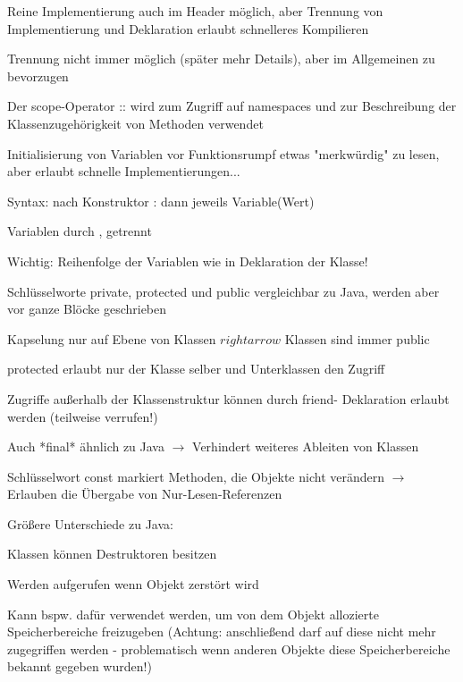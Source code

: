 \documentclass[10pt]{article}
\begin{document}
\begin{itemize*}
\begin{itemize*}
  \item Reine Implementierung auch im Header möglich, aber Trennung von Implementierung und Deklaration erlaubt schnelleres Kompilieren
  \item Trennung nicht immer möglich (später mehr Details), aber im Allgemeinen zu bevorzugen
  \item Der scope-Operator :: wird zum Zugriff auf namespaces und zur Beschreibung der Klassenzugehörigkeit von Methoden verwendet
  \item Initialisierung von Variablen vor Funktionsrumpf etwas "merkwürdig" zu lesen, aber erlaubt schnelle Implementierungen...
  \begin{itemize*}
    \item Syntax: nach Konstruktor : dann jeweils Variable(Wert)
    \item Variablen durch , getrennt
    \item Wichtig: Reihenfolge der Variablen wie in Deklaration der Klasse!
  \end{itemize*}
  \item Schlüsselworte private, protected und public vergleichbar zu Java, werden aber vor ganze Blöcke geschrieben
  \begin{itemize*}
    \item Kapselung nur auf Ebene von Klassen $rightarrow$ Klassen sind immer public
    \item protected erlaubt nur der Klasse selber und Unterklassen den Zugriff
  \end{itemize*}
  \item Zugriffe außerhalb der Klassenstruktur können durch friend- Deklaration erlaubt werden (teilweise verrufen!)
  \item Auch *final* ähnlich zu Java $\rightarrow$ Verhindert weiteres Ableiten von Klassen
  \item Schlüsselwort const markiert Methoden, die Objekte nicht verändern $\rightarrow$ Erlauben die Übergabe von Nur-Lesen-Referenzen
  \item Größere Unterschiede zu Java:
  \begin{itemize*}
    \item Klassen können Destruktoren besitzen
    \begin{itemize*}
      \item Werden aufgerufen wenn Objekt zerstört wird
      \item Kann bspw. dafür verwendet werden, um von dem Objekt allozierte Speicherbereiche freizugeben (Achtung: anschließend darf auf diese nicht mehr zugegriffen werden - problematisch wenn anderen Objekte diese Speicherbereiche bekannt gegeben wurden!)

\end{itemize*}
\end{itemize*}
\end{itemize*}
\end{itemize*}
\end{document}
